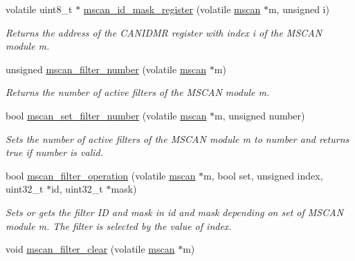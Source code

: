 \begin{DoxyCompactItemize}
volatile uint8\+\_\+t $\ast$ \mbox{\hyperlink{group__RTEMSBSPsPowerPCGen5200MSCAN_ga59f5c272b5395fa083348d087fd4c34e}{mscan\+\_\+id\+\_\+mask\+\_\+register}} (volatile \mbox{\hyperlink{group__RTEMSBSPsPowerPCGen5200MSCAN_gacfd56a4a482c5e7da2cff003284b2d51}{mscan}} $\ast$m, unsigned i)
\begin{DoxyCompactList}\small\item\em Returns the address of the C\+A\+N\+I\+D\+MR register with index {\itshape i} of the M\+S\+C\+AN module {\itshape m}. \end{DoxyCompactList}\item 
unsigned \mbox{\hyperlink{group__RTEMSBSPsPowerPCGen5200MSCAN_gae319b1e5e7cf1062871cf930633ccf0c}{mscan\+\_\+filter\+\_\+number}} (volatile \mbox{\hyperlink{group__RTEMSBSPsPowerPCGen5200MSCAN_gacfd56a4a482c5e7da2cff003284b2d51}{mscan}} $\ast$m)
\begin{DoxyCompactList}\small\item\em Returns the number of active filters of the M\+S\+C\+AN module {\itshape m}. \end{DoxyCompactList}\item 
bool \mbox{\hyperlink{group__RTEMSBSPsPowerPCGen5200MSCAN_gab1e2410b46710969d0b6c886e1eb4eb4}{mscan\+\_\+set\+\_\+filter\+\_\+number}} (volatile \mbox{\hyperlink{group__RTEMSBSPsPowerPCGen5200MSCAN_gacfd56a4a482c5e7da2cff003284b2d51}{mscan}} $\ast$m, unsigned number)
\begin{DoxyCompactList}\small\item\em Sets the number of active filters of the M\+S\+C\+AN module {\itshape m} to {\itshape number} and returns true if {\itshape number} is valid. \end{DoxyCompactList}\item 
bool \mbox{\hyperlink{group__RTEMSBSPsPowerPCGen5200MSCAN_gafae77c5bbc712dd3fe5e7432462e3d08}{mscan\+\_\+filter\+\_\+operation}} (volatile \mbox{\hyperlink{group__RTEMSBSPsPowerPCGen5200MSCAN_gacfd56a4a482c5e7da2cff003284b2d51}{mscan}} $\ast$m, bool set, unsigned index, uint32\+\_\+t $\ast$id, uint32\+\_\+t $\ast$mask)
\begin{DoxyCompactList}\small\item\em Sets or gets the filter ID and mask in {\itshape id} and {\itshape mask} depending on {\itshape set} of M\+S\+C\+AN module {\itshape m}. The filter is selected by the value of {\itshape index}. \end{DoxyCompactList}\item 
void \mbox{\hyperlink{group__RTEMSBSPsPowerPCGen5200MSCAN_gaea10ec6ee1163bdb33ff13b21332dfd7}{mscan\+\_\+filter\+\_\+clear}} (volatile \mbox{\hyperlink{group__RTEMSBSPsPowerPCGen5200MSCAN_gacfd56a4a482c5e7da2cff003284b2d51}{mscan}} $\ast$m)

\end{DoxyCompactItemize}
